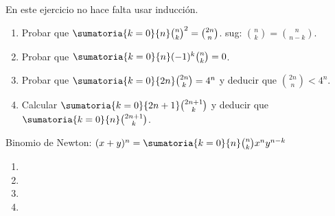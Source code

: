 \ejercicio
En este ejercicio no hace falta usar inducción.
\begin{enumerate}[label=\roman*)]
	\item Probar que $\sumatoria{k = 0}{n} \binom{n}{k}^2 = \binom{2n}{n}$. \qquad sug: $\binom{n}{k} = \binom{n}{n-k}$.
	\item Probar que $\sumatoria{k = 0}{n} (-1)^k \binom{n}{k} = 0$.
	\item Probar que $\sumatoria{k = 0}{2n} \binom{2n}{k} = 4^n$ y deducir que $\binom{2n}{n} < 4^n$.
	\item Calcular $\sumatoria{k = 0}{2n+1} \binom{2n+1}{k}$ y deducir que $\sumatoria{k=0}{n} \binom{2n+1}{k}$.
\end{enumerate}

\separadorCorto
\hacer
Binomio de Newton: $(x + y)^n = \sumatoria{k=0}{n} \binom{n}{k} x^n y^{n-k}$
\begin{enumerate}[label=\roman*)]
	\item 

	\item  

	\item 
	\item 
\end{enumerate}

